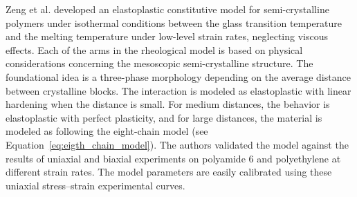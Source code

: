 



Zeng et al. \citep{zengConstitutiveModelSemicrystalline2010} developed an elastoplastic constitutive model for semi-crystalline polymers under isothermal conditions between the glass transition temperature and the melting temperature under low-level strain rates, neglecting viscous effects.
Each of the arms in the rheological model is based on physical considerations concerning the mesoscopic semi-crystalline structure.
The foundational idea is a three-phase morphology depending on the average distance between crystalline blocks.
The interaction is modeled as elastoplastic with linear hardening when the distance is small.
For medium distances, the behavior is elastoplastic with perfect plasticity, and for large distances, the material is modeled as following the eight-chain model (see Equation~\eqref{eq:eigth_chain_model}).
The authors validated the model against the results of uniaxial and biaxial experiments on polyamide 6 and polyethylene at different strain rates.
The model parameters are easily calibrated using these uniaxial stress–strain experimental curves.

